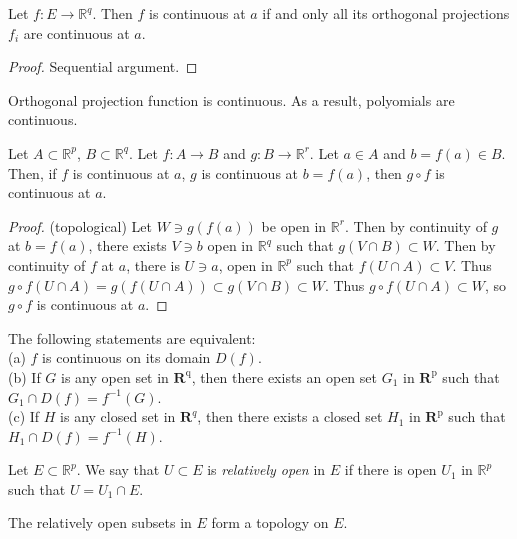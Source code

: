 
\begin{proposition}
	Let $f: E \to \mathbb{R}^q$. Then $f$ is continuous at $a$ if and only all its orthogonal projections $f_i$ are continuous at $a$.
\end{proposition}
\begin{proof}
	Sequential argument.
\end{proof}

\begin{corollary}
	Orthogonal projection function is continuous. As a result, polyomials are continuous.
\end{corollary}

\begin{proposition}
	Let $A \subset \mathbb{R}^p$, $B \subset \mathbb{R}^q$. Let $f: A \to B$ and $g: B \to \mathbb{R}^r$. Let $a \in A$ and $b = f(a) \in B$. Then, if $f$ is continuous at $a$, $g$ is continuous at $b = f(a)$, then $g \circ f$ is continuous at $a$.
\end{proposition}
\begin{proof}
	(topological)
	Let $W \ni g(f(a))$ be open in $\mathbb{R}^r$. Then by continuity of $g$ at $b = f(a)$, there exists $V \ni b$ open in $\mathbb{R}^q$ such that $g(V \cap B)\subset W$. Then by continuity of $f$ at $a$, there is $U \ni a$, open in $\mathbb{R}^p$ such that $f(U \cap A) \subset V$. Thus $g \circ f (U \cap A) = g(f(U \cap A)) \subset g(V \cap B) \subset W$. Thus $g\circ f(U \cap A) \subset W$, so $g \circ f$ is continuous at $a$.
\end{proof}

\begin{theorem}
	The following statements are equivalent:\\
(a) $f$ is continuous on its domain $D(f)$.\\
(b) If $G$ is any open set in $\boldsymbol{R}^{\mathrm{q}}$, then there exists an open set $G_1$ in $\boldsymbol{R}^{\mathrm{p}}$ such that $G_1 \cap D(f)=f^{-1}(G)$.\\
(c) If $H$ is any closed set in $\mathbf{R}^q$, then there exists a closed set $H_1$ in $\mathbf{R}^{\mathrm{p}}$ such that $H_1 \cap D(f)=f^{-1}(H)$.
\end{theorem}

\begin{definition}
	Let $E \subset \mathbb{R}^p$. We say that $U \subset E$ is \textit{relatively open} in $E$ if there is open $U_1$ in $\mathbb{R}^p$ such that $U = U_1 \cap E$.
\end{definition}
The relatively open subsets in $E$ form a topology on $E$.

